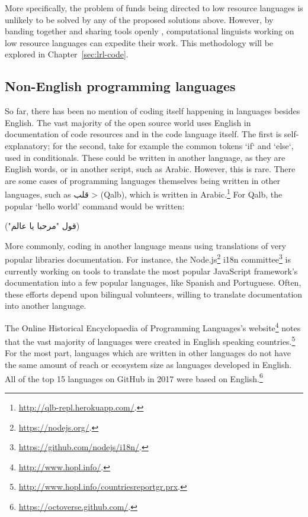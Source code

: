More specifically, the problem of funds being directed to low resource languages is unlikely to be solved by any of the proposed solutions above. However, by banding together and sharing tools openly \citep{streiter2006implementing}, computational linguists working on low resource languages can expedite their work. This methodology will be explored in Chapter~\ref{sec:lrl-code}.

\subsection{Non-English programming languages}


So far, there has been no mention of coding itself happening in languages besides English. The vast majority of the open source world uses English in documentation of code resources and in the code language itself. The first is self-explanatory; for the second, take for example the common tokens `if` and `else`, used in conditionals. These could be written in another language, as they are English words, or in another script, such as Arabic. However, this is rare. There are some cases of programming languages themselves being written in other languages, such as \< قلب > (Qalb), which is written in Arabic.\footnote{\href{http://qlb-repl.herokuapp.com/}{http://qlb-repl.herokuapp.com/}. } For Qalb, the popular `hello world' command would be written:

\begin{arabtext}
(قول "مرحبا يا عالم"‏)
\end{arabtext}

More commonly, coding in another language means using translations of very popular libraries documentation. For instance, the Node.js\footnote{\href{https://nodejs.org/}{https://nodejs.org/}. } i18n committee\footnote{\href{https://github.com/nodejs/i18n/}{https://github.com/nodejs/i18n/}. } is currently working on tools to translate the most popular JavaScript framework's documentation into a few popular languages, like Spanish and Portuguese. Often, these efforts depend upon bilingual volunteers, willing to translate documentation into another language.

The Online Historical Encyclopaedia of Programming Languages's website\footnote{\href{http://www.hopl.info/}{http://www.hopl.info/}. } notes that the vast majority of languages were created in English speaking countries.\footnote{\href{http://www.hopl.info/countriesreportgr.prx}{http://www.hopl.info/countriesreportgr.prx}. } For the most part, languages which are written in other languages do not have the same amount of reach or ecosystem size as languages developed in English. All of the top 15 languages on GitHub in 2017 were based on English.\footnote{\href{https://octoverse.github.com/}{https://octoverse.github.com/}. }

